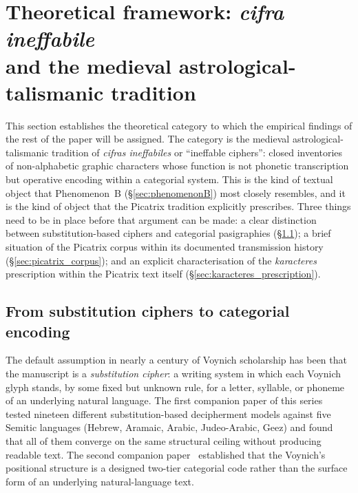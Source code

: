 \section[Theoretical framework: \textit{cifra ineffabile} and the
talismanic tradition]{Theoretical framework: \textit{cifra ineffabile}\\
and the medieval astrological-talismanic tradition}
\label{sec:framework}

This section establishes the theoretical category to which the empirical
findings of the rest of the paper will be assigned. The category is the
medieval astrological-talismanic tradition of \textit{cifras ineffabiles}
or ``ineffable ciphers'': closed inventories of non-alphabetic graphic
characters whose function is not phonetic transcription but operative
encoding within a categorial system. This is the kind of textual object
that Phenomenon~B (\S\ref{sec:phenomenonB}) most closely resembles, and
it is the kind of object that the Picatrix tradition explicitly
prescribes. Three things need to be in place before that argument can
be made: a clear distinction between substitution-based ciphers and
categorial pasigraphies (\S\ref{sec:cat_encoding}); a brief situation
of the Picatrix corpus within its documented transmission history
(\S\ref{sec:picatrix_corpus}); and an explicit characterisation of the
\textit{karacteres} prescription within the Picatrix text itself
(\S\ref{sec:karacteres_prescription}).

\subsection{From substitution ciphers to categorial encoding}
\label{sec:cat_encoding}

The default assumption in nearly a century of Voynich scholarship has
been that the manuscript is a \emph{substitution cipher}: a writing
system in which each Voynich glyph stands, by some fixed but unknown
rule, for a letter, syllable, or phoneme of an underlying natural
language. The first companion paper of this series~\citep{jimenez2026negative}
tested nineteen different substitution-based decipherment models against
five Semitic languages (Hebrew, Aramaic, Arabic, Judeo-Arabic, Geez)
and found that all of them converge on the same structural ceiling
without producing readable text. The second companion
paper~\citep{jimenez2026twotier} established that the Voynich's
positional structure is a designed two-tier categorial code rather
than the surface form of an underlying natural-language text.

